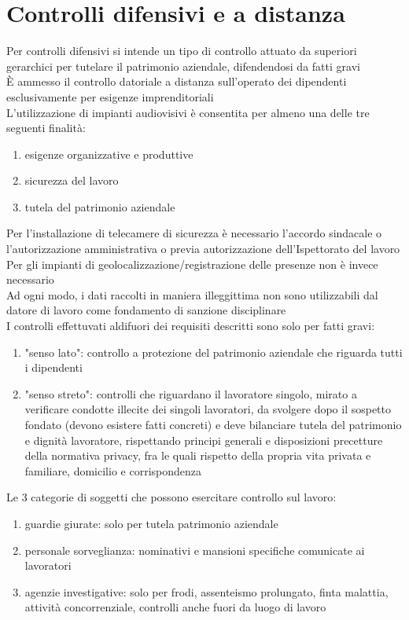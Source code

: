\documentclass[8pt,oneside,a4paper]{article}
\begin{document}
	\section{Controlli difensivi e a distanza}
	Per controlli difensivi si intende un tipo di controllo attuato da superiori gerarchici per tutelare il patrimonio aziendale, difendendosi da fatti gravi\\
	È ammesso il controllo datoriale a distanza sull'operato dei dipendenti esclusivamente per esigenze imprenditoriali\\
	L'utilizzazione di impianti audiovisivi è consentita per almeno una delle tre seguenti finalità:
	\begin{enumerate}
		\item esigenze organizzative e produttive
		\item sicurezza del lavoro
		\item tutela del patrimonio aziendale
	\end{enumerate}
	Per l'installazione di telecamere di sicurezza è necessario l'accordo sindacale o l'autorizzazione amministrativa o previa autorizzazione dell'Ispettorato del lavoro\\
	Per gli impianti di geolocalizzazione/registrazione delle presenze non è invece necessario\\
	Ad ogni modo, i dati raccolti in maniera illeggittima non sono utilizzabili dal datore di lavoro come fondamento di sanzione disciplinare\\
	I controlli effettuvati aldifuori dei requisiti descritti sono solo per fatti gravi:
	\begin{enumerate}
		\item "senso lato": controllo a protezione del patrimonio aziendale che riguarda tutti i dipendenti
		\item "senso streto": controlli che riguardano il lavoratore singolo, mirato a verificare condotte illecite dei singoli lavoratori, da svolgere dopo il sospetto fondato (devono esistere fatti concreti) e deve bilanciare tutela del patrimonio e dignità lavoratore, rispettando principi generali e disposizioni precetture della normativa privacy, fra le quali rispetto della propria vita privata e familiare, domicilio e corrispondenza
	\end{enumerate}
	Le 3 categorie di soggetti che possono esercitare controllo sul lavoro:
	\begin{enumerate}
		\item guardie giurate: solo per tutela patrimonio aziendale
		\item personale sorveglianza: nominativi e mansioni specifiche comunicate ai lavoratori
		\item agenzie investigative: solo per frodi, assenteismo prolungato, finta malattia, attività concorrenziale, controlli anche fuori da luogo di lavoro
	\end{enumerate}
\end{document}
